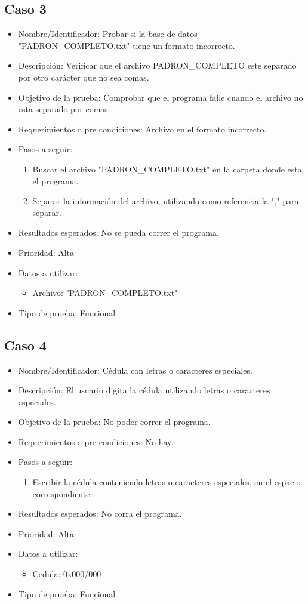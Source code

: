 \documentclass[conference]{IEEEtran}
\begin{document}
\subsection{Caso 3}
\begin{itemize}
\item Nombre/Identificador: Probar si la base de datos "PADRON\_COMPLETO.txt" tiene un formato incorrecto.
\item Descripción: Verificar que el archivo PADRON\_COMPLETO este separado por otro carácter que no sea comas.
\item Objetivo de la prueba: Comprobar que el programa falle cuando el archivo no esta separado por comas. 
\item Requerimientos o pre condiciones: Archivo en el formato incorrecto.
\item Pasos a seguir: 
\begin{enumerate}
\item Buscar el archivo "PADRON\_COMPLETO.txt" en la carpeta donde esta el programa.
\item Separar la información del archivo, utilizando como referencia la "," para separar.
\end{enumerate}
\item Resultados esperados: No se pueda correr el programa.
\item Prioridad: Alta
\item Datos a utilizar: 
\begin{itemize}
\item Archivo: "PADRON\_COMPLETO.txt"
\end{itemize}
\item Tipo de prueba: Funcional
\end{itemize}

\subsection{Caso 4}
\begin{itemize}
\item Nombre/Identificador: Cédula con letras o caracteres especiales.
\item Descripción: El usuario digita la cédula utilizando letras o caracteres especiales.
\item Objetivo de la prueba: No poder correr el programa.
\item Requerimientos o pre condiciones: No hay.
\item Pasos a seguir: 
\begin{enumerate}
\item Escribir la cédula conteniendo letras o caracteres especiales, en el espacio correspondiente.
\end{enumerate}
\item Resultados esperados: No corra el programa.
\item Prioridad: Alta
\item Datos a utilizar: 
\begin{itemize}
\item Cedula: 0x000/000
\end{itemize}
\item Tipo de prueba: Funcional
\end{itemize}
\end{document}

